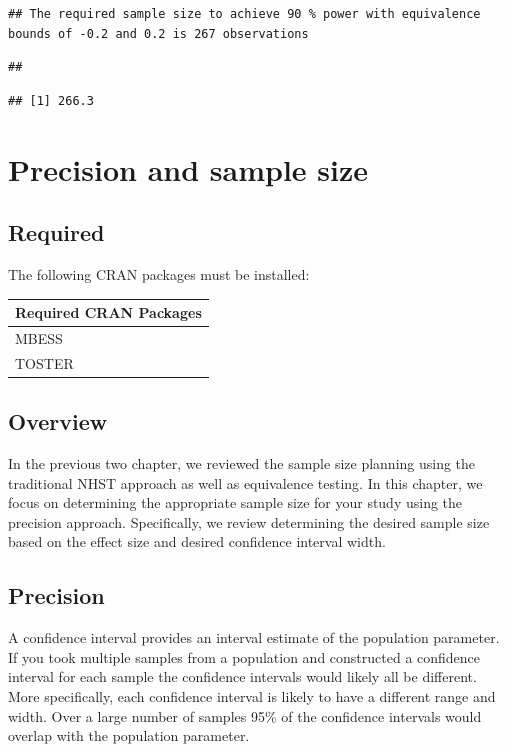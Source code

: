 \documentclass[
]{krantz}
\begin{document}
\begin{verbatim}
## The required sample size to achieve 90 % power with equivalence bounds of -0.2 and 0.2 is 267 observations
\end{verbatim}

\begin{verbatim}
## 
\end{verbatim}

\begin{verbatim}
## [1] 266.3
\end{verbatim}

\hypertarget{precision-and-sample-size}{%
\chapter{Precision and sample size}\label{precision-and-sample-size}}

\hypertarget{required-5}{%
\section{Required}\label{required-5}}

The following CRAN packages must be installed:

\begin{longtable}[]{@{}l@{}}
\toprule
Required CRAN Packages \\
\midrule
\endhead
MBESS \\
TOSTER \\
\bottomrule
\end{longtable}

\hypertarget{overview-4}{%
\section{Overview}\label{overview-4}}

In the previous two chapter, we reviewed the sample size planning using the traditional NHST approach as well as equivalence testing. In this chapter, we focus on determining the appropriate sample size for your study using the precision approach. Specifically, we review determining the desired sample size based on the effect size and desired confidence interval width.

\hypertarget{precision}{%
\section{Precision}\label{precision}}

A confidence interval provides an interval estimate of the population parameter. If you took multiple samples from a population and constructed a confidence interval for each sample the confidence intervals would likely all be different. More specifically, each confidence interval is likely to have a different range and width. Over a large number of samples 95\% of the confidence intervals would overlap with the population parameter.
\end{document}
